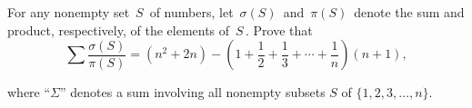 For any nonempty set $\,S\,$ of numbers, let $\,\sigma(S)\,$ and $\,\pi(S)\,$ denote the sum and product, respectively, of the elements of $\,S\,$.  Prove that\[ \sum \frac{\sigma(S)}{\pi(S)} = (n^2 + 2n) - \left(1 + \frac{1}{2} + \frac{1}{3} + \cdots + \frac{1}{n} \right) (n+1),  \]

where ``$\Sigma$'' denotes a sum involving all nonempty subsets $S$ of $\{1,2,3, \ldots,n\}$.